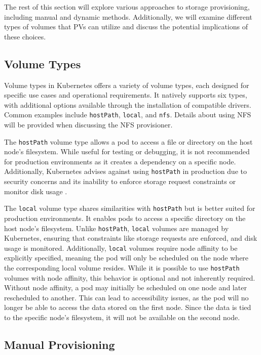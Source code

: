 The rest of this section will explore various approaches to storage provisioning, including manual and dynamic methods. Additionally, we will examine different types of volumes that PVs can utilize and discuss the potential implications of these choices.

\subsection{Volume Types} 
Volume types in Kubernetes offers a variety of volume types, each designed for specific use cases and operational requirements. It natively supports six types, with additional options available through the installation of compatible drivers. Common examples include \texttt{hostPath}, \texttt{local}, and \texttt{nfs}. Details about using NFS will be provided when discussing the NFS provisioner.

The \texttt{hostPath} volume type allows a pod to access a file or directory on the host node's filesystem. While useful for testing or debugging, it is not recommended for production environments as it creates a dependency on a specific node. Additionally, Kubernetes advises against using \texttt{hostPath} in production due to security concerns and its inability to enforce storage request constraints or monitor disk usage \Parencite{kubernetes_hostpath}.

The \texttt{local} volume type shares similarities with \texttt{hostPath} but is better suited for production environments. It enables pods to access a specific directory on the host node's filesystem. Unlike \texttt{hostPath}, \texttt{local} volumes are managed by Kubernetes, ensuring that constraints like storage requests are enforced, and disk usage is monitored. Additionally, \texttt{local} volumes require node affinity to be explicitly specified, meaning the pod will only be scheduled on the node where the corresponding local volume resides. While it is possible to use \texttt{hostPath} volumes with node affinity, this behavior is optional and not inherently required. Without node affinity, a pod may initially be scheduled on one node and later rescheduled to another. This can lead to accessibility issues, as the pod will no longer be able to access the data stored on the first node. Since the data is tied to the specific node's filesystem, it will not be available on the second node. 

\subsection{Manual Provisioning} 

